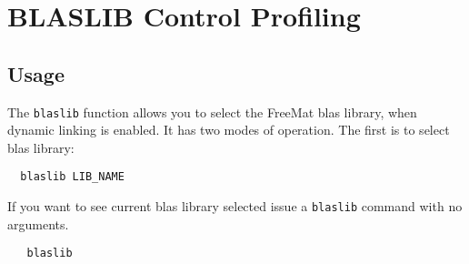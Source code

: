 \section{BLASLIB Control Profiling}

\subsection{Usage}

The \verb|blaslib| function allows you to select the FreeMat blas library, 
when dynamic linking is enabled.
It has two modes of operation.  The first is to select blas library:
\begin{verbatim}
  blaslib LIB_NAME
\end{verbatim}
If you want to see current blas library selected
issue a \verb|blaslib| command with no arguments.
\begin{verbatim}
   blaslib
\end{verbatim}
